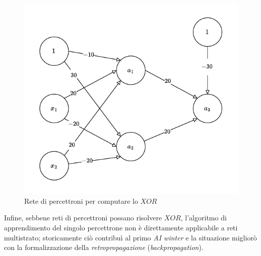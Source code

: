 \begin{figure}[tbph]
	\centering
	\includegraphics[width=0.7\linewidth]{images/neural-net-xor}
	\caption{Rete di percettroni per computare lo $XOR$}
\end{figure}


Infine, sebbene reti di percettroni possano risolvere $XOR$, l’algoritmo di apprendimento del singolo percettrone non è direttamente applicabile a reti multistrato; storicamente ciò contribuì al primo \emph{AI winter} e la situazione migliorò con la formalizzazione della \emph{retropropagazione} (\emph{backpropagation}). 
